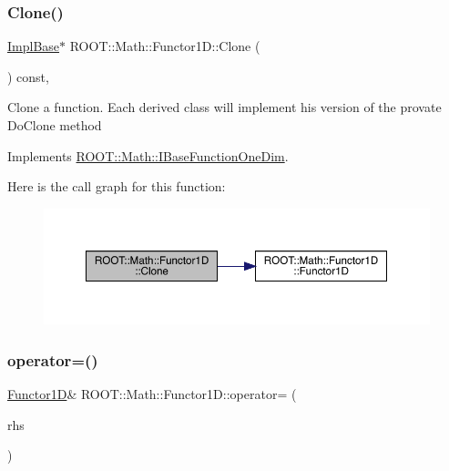 \subsubsection{\texorpdfstring{Clone()}{Clone()}\hspace{0.1cm}{\footnotesize\ttfamily [2/2]}}
{\footnotesize\ttfamily \mbox{\hyperlink{classROOT_1_1Math_1_1Functor1D_a1ade2017edb7db0cbaf9a27a864f4dd3}{Impl\+Base}}$\ast$ R\+O\+O\+T\+::\+Math\+::\+Functor1\+D\+::\+Clone (\begin{DoxyParamCaption}{ }\end{DoxyParamCaption}) const\hspace{0.3cm}{\ttfamily [inline]}, {\ttfamily [virtual]}}

Clone a function. Each derived class will implement his version of the provate Do\+Clone method 

Implements \mbox{\hyperlink{classROOT_1_1Math_1_1IBaseFunctionOneDim_a656dbb4dfc43e8d1566442bfb1a717fd}{R\+O\+O\+T\+::\+Math\+::\+I\+Base\+Function\+One\+Dim}}.

Here is the call graph for this function\+:
\nopagebreak
\begin{figure}[H]
\begin{center}
\leavevmode
\includegraphics[width=350pt]{dc/d6d/classROOT_1_1Math_1_1Functor1D_af77ece084fc56e41c06e32e0f78a88a9_cgraph}
\end{center}
\end{figure}
\mbox{\label{classROOT_1_1Math_1_1Functor1D_a723dff64cd3d4e53174624fa56f30a18}} 
\subsubsection{\texorpdfstring{operator=()}{operator=()}\hspace{0.1cm}{\footnotesize\ttfamily [1/2]}}
{\footnotesize\ttfamily \mbox{\hyperlink{classROOT_1_1Math_1_1Functor1D}{Functor1D}}\& R\+O\+O\+T\+::\+Math\+::\+Functor1\+D\+::operator= (\begin{DoxyParamCaption}\item[{const \mbox{\hyperlink{classROOT_1_1Math_1_1Functor1D}{Functor1D}} \&}]{rhs }\end{DoxyParamCaption})\hspace{0.3cm}{\ttfamily [inline]}}

